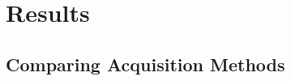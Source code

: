 

\section{Results}
\respace
\label{sec:results}

\subsection{Comparing Acquisition Methods}
\respace
    
